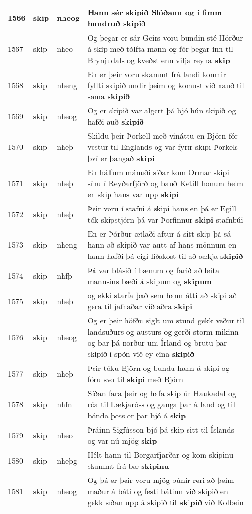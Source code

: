 \documentclass{article}
\begin{document}
\begin{longtable}{p{1cm}|p{1cm}|p{1cm}|p{13cm}}
\hline
1566&skip&nheog&Hann sér skipið Slóðann og í fimm hundruð \textbf{skipið} \\
\hline
1567&skip&nheo&Og þegar er sár Geirs voru bundin sté Hörður á skip með tólfta mann og fór þegar inn til Brynjudals og kveðst enn vilja reyna \textbf{skip} \\
\hline
1568&skip&nheng&En er þeir voru skammt frá landi komnir fyllti skipið undir þeim og komust við nauð til sama \textbf{skipið} \\
\hline
1569&skip&nheog&Og er skipið var algert þá bjó hún skipið og hafði auð \textbf{skipið} \\
\hline
1570&skip&nheþ&Skildu þeir Þorkell með vináttu en Björn fór vestur til Englands og var fyrir skipi Þorkels því er þangað \textbf{skipi} \\
\hline
1571&skip&nheþ&En hálfum mánuði síðar kom Ormar skipi sínu í Reyðarfjörð og bauð Ketill honum heim en skip hans var upp \textbf{skipi} \\
\hline
1572&skip&nheþ&Þeir voru í stafni á skipi hans en þá er Egill tók skipstjórn þá var Þorfinnur \textbf{skipi} stafnbúi\\
\hline
1573&skip&nheng&En er Þórður ætlaði aftur á sitt skip þá sá hann að skipið var autt af hans mönnum en hann hafði þá eigi liðskost til að sækja \textbf{skipið} \\
\hline
1574&skip&nhfþ&Þá var blásið í bænum og farið að leita mannsins bæði á skipum og \textbf{skipum} \\
\hline
1575&skip&nheþ&og ekki starfa það sem hann átti að skipi að gera til jafnaðar við aðra \textbf{skipi} \\
\hline
1576&skip&nheog&Og er þeir höfðu siglt um stund gekk veður til landsuðurs og austurs og gerði storm mikinn og bar þá norður um Írland og brutu þar skipið í spón við ey eina \textbf{skipið} \\
\hline
1577&skip&nheþ&Þeir tóku Björn og bundu hann á skipi og fóru svo til \textbf{skipi} með Björn\\
\hline
1578&skip&nhfn&Síðan fara þeir og hafa skip úr Haukadal og róa til Lækjaróss og ganga þar á land og til bónda þess er þar bjó á \textbf{skip} \\
\hline
1579&skip&nheo&Þráinn Sigfússon bjó þá skip sitt til Íslands og var nú mjög \textbf{skip} \\
\hline
1580&skip&nheþg&Hélt hann til Borgarfjarðar og kom skipinu skammt frá bæ \textbf{skipinu} \\
\hline
1581&skip&nheog&Og þá er þeir voru mjög búnir reri að þeim maður á báti og festi bátinn við skipið en gekk síðan upp á skipið til \textbf{skipið} við Kolbein\\

\end{longtable}
\end{document}
